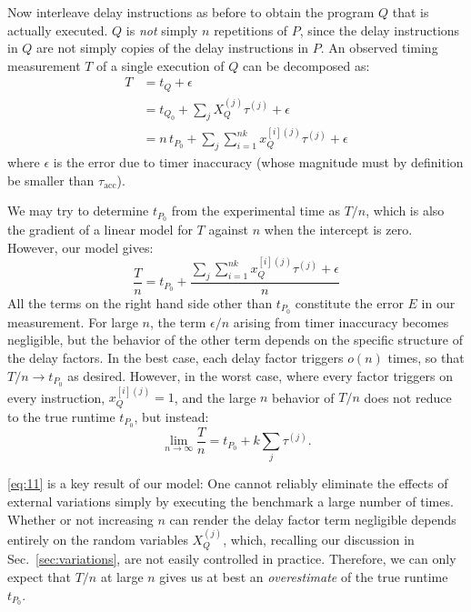 \documentclass[conference]{IEEEtran}
\begin{document}
Now interleave delay instructions as before to obtain the program $Q$ that is actually
executed. $Q$ is \textit{not} simply $n$ repetitions of $P$, since the delay instructions in
$Q$ are not simply copies of the delay instructions in $P$. An observed timing measurement
$T$ of a single execution of $Q$ can be decomposed as:
%
\begin{align}
    T &= t_{Q} + \epsilon \\ \nonumber
      &= t_{Q_0} + \sum_{j} X_Q^{(j)} \tau^{(j)} + \epsilon \\ \nonumber
      &= n \, t_{P_0} + \sum_{j} \sum_{i=1}^{nk} x_Q^{[i](j)} \tau^{(j)} + \epsilon
\end{align}
%
where $\epsilon$ is the error due to timer inaccuracy (whose magnitude must by definition be smaller than $\tau_\textrm{acc}$).

We may try to determine $t_{P_0}$ from the experimental time as $T/n$, which is
also the gradient of a linear model for $T$ against $n$ when the intercept is
zero. However, our model gives:
%
\vspace{-0.10cm}
\begin{equation}
    \frac{T}{n} = t_{P_0} + \frac{\sum_{j} \sum_{i=1}^{nk} x_Q^{[i](j)} \tau^{(j)} + \epsilon}{n}
\end{equation}
%
All the terms on the right hand side other than $t_{P_0}$ constitute the
error $E$ in our measurement. For large $n$, the term $\epsilon/n$ arising from
timer inaccuracy becomes negligible, but the behavior of the other term depends
on the specific structure of the delay factors. In the best case, each delay
factor triggers $o(n)$ times, so that $T/n\to t_{P_0}$ as desired. However, in
the worst case, where every factor triggers on every instruction, $x_Q^{[i](j)}
= 1$, and the large $n$ behavior of $T/n$ does not reduce to the true runtime
$t_{P_0}$, but instead:
%
\begin{equation}
\label{eq:11}
    \lim_{n\to\infty} \frac{T}{n} = t_{P_0} + k \sum_{j} \tau^{(j)}.
\end{equation}

\eqref{eq:11} is a key result of our model: One cannot reliably eliminate the
effects of external variations simply by executing the benchmark a large number
of times. Whether or not increasing $n$ can render the delay factor term
negligible depends entirely on the random variables $X_Q^{(j)}$, which,
recalling our discussion in Sec.~\ref{sec:variations}, are not easily
controlled in practice. Therefore, we can only expect that $T/n$ at large $n$
gives us at best an \textit{overestimate} of the true runtime $t_{P_0}$.
\end{document}
